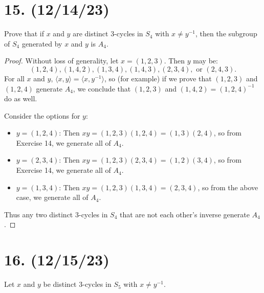 \documentclass{article}
\begin{document}
\section*{15. (12/14/23)}

Prove that if $x$ and $y$ are distinct 3-cycles in $S_4$ with $x \neq y^{-1}$, then the subgroup of $S_4$ generated by $x$ and $y$ is $A_4$.

\begin{proof}
    Without loss of generality, let $x = (1, 2, 3)$. Then $y$ may be:
    \begin{equation*}
        (1, 2, 4), (1, 4, 2), (1, 3, 4), (1, 4, 3), (2, 3, 4), \text{ or } (2, 4, 3).
    \end{equation*}
    For all $x$ and $y$, $\langle x, y \rangle = \langle x, y^{-1} \rangle$, so (for example) if we prove that $(1, 2, 3)$ and $(1, 2, 4)$ generate $A_4$, we conclude that $(1, 2, 3)$ and $(1, 4, 2) = (1, 2, 4)^{-1}$ do as well.

    Consider the options for $y$:
    \begin{itemize}[itemsep=0em]
        \item $y = (1, 2, 4)$: Then $xy = (1, 2, 3)(1, 2, 4) = (1, 3)(2, 4)$, so from Exercise 14, we generate all of $A_4$.
        \item $y = (2, 3, 4)$: Then $xy = (1, 2, 3)(2, 3, 4) = (1, 2)(3, 4)$, so from Exercise 14, we generate all of $A_4$.
        \item $y = (1, 3, 4)$: Then $xy = (1, 2, 3)(1, 3, 4) = (2, 3, 4)$, so from the above case, we generate all of $A_4$.
    \end{itemize}
    Thus any two distinct 3-cycles in $S_4$ that are not each other's inverse generate $A_4$.
\end{proof}

\section*{16. (12/15/23)}

Let $x$ and $y$ be distinct 3-cycles in $S_5$ with $x \neq y^{-1}$.
\end{document}
